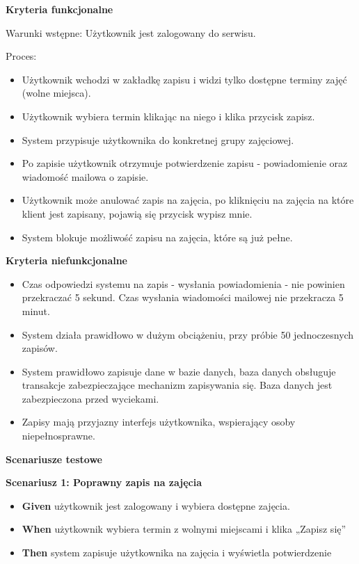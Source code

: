 \documentclass[a4paper,12pt]{article}
\begin{document}
\vspace{0,2cm}

\noindent \textbf{Kryteria funkcjonalne}

\vspace{0,2cm}

\noindent Warunki wstępne: Użytkownik jest zalogowany do serwisu.

\vspace{0,2cm}

\noindent Proces:

\begin{itemize}
    \item Użytkownik wchodzi w zakładkę zapisu i widzi tylko dostępne terminy zajęć (wolne miejsca).
    \item Użytkownik wybiera termin klikając na niego i klika przycisk zapisz.
    \item System przypisuje użytkownika do konkretnej grupy zajęciowej.
    \item Po zapisie użytkownik otrzymuje potwierdzenie zapisu - powiadomienie oraz wiadomość mailowa o zapisie.
    \item Użytkownik może anulować zapis na zajęcia, po kliknięciu na zajęcia na które klient jest zapisany, pojawią się przycisk wypisz mnie.
    \item System blokuje możliwość zapisu na zajęcia, które są już pełne.
\end{itemize}

\noindent \textbf{Kryteria niefunkcjonalne}
\begin{itemize}
    \item Czas odpowiedzi systemu na zapis - wysłania powiadomienia - nie powinien przekraczać 5 sekund. Czas wysłania wiadomości mailowej nie przekracza 5 minut.
    \item System działa prawidłowo w dużym obciążeniu, przy próbie 50 jednoczesnych zapisów.
    \item System prawidłowo zapisuje dane w bazie danych, baza danych obsługuje transakcje zabezpieczające mechanizm zapisywania się. Baza danych jest zabezpieczona przed wyciekami.
    \item Zapisy mają przyjazny interfejs użytkownika, wspierający osoby niepełnosprawne.
\end{itemize}

\noindent \textbf{Scenariusze testowe}

\textbf{Scenariusz 1: Poprawny zapis na zajęcia}
\begin{itemize}
    \item \textbf{Given} użytkownik jest zalogowany i wybiera dostępne zajęcia.
    \item \textbf{When} użytkownik wybiera termin z wolnymi miejscami i klika „Zapisz się”
    \item \textbf{Then} system zapisuje użytkownika na zajęcia i wyświetla potwierdzenie
\end{itemize}
\end{document}
